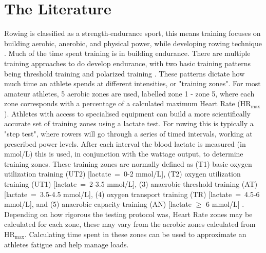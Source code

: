 \documentclass[a4paper]{article}
\begin{document}
\section{The Literature}
Rowing is classified as a strength-endurance sport, this means training focuses on building aerobic, anerobic, and physical power, while developing rowing technique \autocite{Mäestu2005}. Much of the time spent training is in building endurance. There are multiple training approaches to do develop endurance, with two basic training patterns being threshold training and polarized training \autocite{Seiler2006}. These patterns dictate how much time an athlete spends at different intensities, or "training zones". For most amateur athletes, 5 aerobic zones are used, labelled zone 1 - zone 5, where each zone corresponds with a percentage of a calculated maximum Heart Rate ($\textrm{HR}_{\text{max}}$). 
Athletes with access to specialised equipment can build a more scientifically accurate set of training zones using a lactate test. For rowing this is typically a "step test", where rowers will go through a series of timed intervals, working at prescribed power levels. After each interval the blood lactate is measured (in mmol/L) this is used, in conjunction with the wattage output, to determine training zones. These training zones are normally defined as (T1) basic oxygen utilization training (UT2) [lactate~=~0-2 mmol/L], (T2) oxygen utilization training (UT1) [lactate~=~2-3.5 mmol/L], (3) anaerobic threshold training (AT) [lactate~=~3.5-4.5 mmol/L], (4) oxygen transport training (TR) [lactate~=~4.5-6 mmol/L], and (5) anaerobic capacity training (AN) [lactate $\geq$ 6 mmol/L] \autocite{Das2022}. Depending on how rigorous the testing protocol was, Heart Rate zones may be calculated for each zone, these may vary from the aerobic zones calculated from $\textrm{HR}_{\text{max}}$. 
Calculating time spent in these zones can be used to approximate an athletes fatigue and help manage loads.
\end{document}
